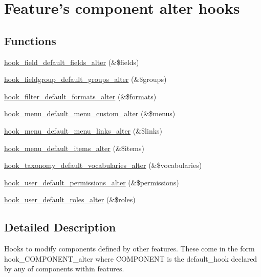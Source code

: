 \hypertarget{group__features__component__alter__hooks}{
\section{Feature's component alter hooks}
\label{group__features__component__alter__hooks}
}
\subsection*{Functions}
\begin{DoxyCompactItemize}
\item 
\hyperlink{group__features__component__alter__hooks_ga3016751cc0cbd57d187bc995601b37f9}{hook\_\-field\_\-default\_\-fields\_\-alter} (\&\$fields)
\item 
\hyperlink{group__features__component__alter__hooks_ga627a5cda9de3fa0baa4091fbd798aa9a}{hook\_\-fieldgroup\_\-default\_\-groups\_\-alter} (\&\$groups)
\item 
\hyperlink{group__features__component__alter__hooks_gae14b73f67a50cd515cac9718d84014f4}{hook\_\-filter\_\-default\_\-formats\_\-alter} (\&\$formats)
\item 
\hyperlink{group__features__component__alter__hooks_gad81e139fd9584fcfbd5f9c1ece67e48b}{hook\_\-menu\_\-default\_\-menu\_\-custom\_\-alter} (\&\$menus)
\item 
\hyperlink{group__features__component__alter__hooks_ga86626f45ed4bf19d0cc56db05a1c045e}{hook\_\-menu\_\-default\_\-menu\_\-links\_\-alter} (\&\$links)
\item 
\hyperlink{group__features__component__alter__hooks_ga3b0718b5296604a189304b76378b0467}{hook\_\-menu\_\-default\_\-items\_\-alter} (\&\$items)
\item 
\hyperlink{group__features__component__alter__hooks_ga5e43b3c1b03d748e9da468c83d3a1efc}{hook\_\-taxonomy\_\-default\_\-vocabularies\_\-alter} (\&\$vocabularies)
\item 
\hyperlink{group__features__component__alter__hooks_ga905999267231b7418a89a4856dbbfc00}{hook\_\-user\_\-default\_\-permissions\_\-alter} (\&\$permissions)
\item 
\hyperlink{group__features__component__alter__hooks_gaad88a5479c355cebaa80b017f0a83a4d}{hook\_\-user\_\-default\_\-roles\_\-alter} (\&\$roles)
\end{DoxyCompactItemize}


\subsection{Detailed Description}
Hooks to modify components defined by other features. These come in the form hook\_\-COMPONENT\_\-alter where COMPONENT is the default\_\-hook declared by any of components within features.

